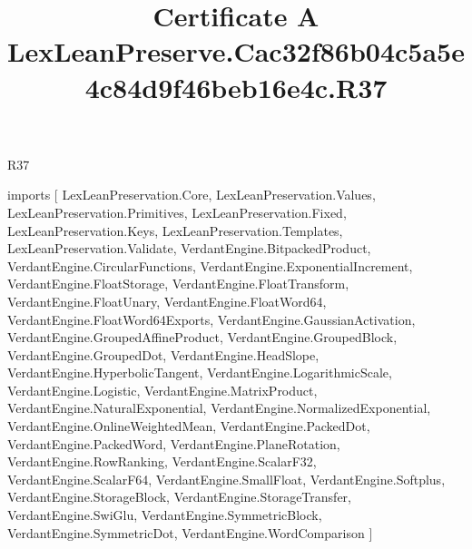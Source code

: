 \begin{lexlean}{R37}
\title{Certificate A LexLeanPreserve.Cac32f86b04c5a5e4c84d9f46beb16e4c.R37}
\begin{coremodule}
imports [
  LexLeanPreservation.Core,
  LexLeanPreservation.Values,
  LexLeanPreservation.Primitives,
  LexLeanPreservation.Fixed,
  LexLeanPreservation.Keys,
  LexLeanPreservation.Templates,
  LexLeanPreservation.Validate,
  VerdantEngine.BitpackedProduct,
  VerdantEngine.CircularFunctions,
  VerdantEngine.ExponentialIncrement,
  VerdantEngine.FloatStorage,
  VerdantEngine.FloatTransform,
  VerdantEngine.FloatUnary,
  VerdantEngine.FloatWord64,
  VerdantEngine.FloatWord64Exports,
  VerdantEngine.GaussianActivation,
  VerdantEngine.GroupedAffineProduct,
  VerdantEngine.GroupedBlock,
  VerdantEngine.GroupedDot,
  VerdantEngine.HeadSlope,
  VerdantEngine.HyperbolicTangent,
  VerdantEngine.LogarithmicScale,
  VerdantEngine.Logistic,
  VerdantEngine.MatrixProduct,
  VerdantEngine.NaturalExponential,
  VerdantEngine.NormalizedExponential,
  VerdantEngine.OnlineWeightedMean,
  VerdantEngine.PackedDot,
  VerdantEngine.PackedWord,
  VerdantEngine.PlaneRotation,
  VerdantEngine.RowRanking,
  VerdantEngine.ScalarF32,
  VerdantEngine.ScalarF64,
  VerdantEngine.SmallFloat,
  VerdantEngine.Softplus,
  VerdantEngine.StorageBlock,
  VerdantEngine.StorageTransfer,
  VerdantEngine.SwiGlu,
  VerdantEngine.SymmetricBlock,
  VerdantEngine.SymmetricDot,
  VerdantEngine.WordComparison
]


\end{coremodule}
\end{lexlean}
